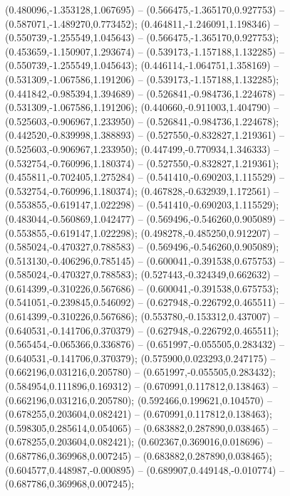  (0.480096,-1.353128,1.067695) -- (0.566475,-1.365170,0.927753) -- (0.587071,-1.489270,0.773452);
 (0.464811,-1.246091,1.198346) -- (0.550739,-1.255549,1.045643) -- (0.566475,-1.365170,0.927753);
 (0.453659,-1.150907,1.293674) -- (0.539173,-1.157188,1.132285) -- (0.550739,-1.255549,1.045643);
 (0.446114,-1.064751,1.358169) -- (0.531309,-1.067586,1.191206) -- (0.539173,-1.157188,1.132285);
 (0.441842,-0.985394,1.394689) -- (0.526841,-0.984736,1.224678) -- (0.531309,-1.067586,1.191206);
 (0.440660,-0.911003,1.404790) -- (0.525603,-0.906967,1.233950) -- (0.526841,-0.984736,1.224678);
 (0.442520,-0.839998,1.388893) -- (0.527550,-0.832827,1.219361) -- (0.525603,-0.906967,1.233950);
 (0.447499,-0.770934,1.346333) -- (0.532754,-0.760996,1.180374) -- (0.527550,-0.832827,1.219361);
 (0.455811,-0.702405,1.275284) -- (0.541410,-0.690203,1.115529) -- (0.532754,-0.760996,1.180374);
 (0.467828,-0.632939,1.172561) -- (0.553855,-0.619147,1.022298) -- (0.541410,-0.690203,1.115529);
 (0.483044,-0.560869,1.042477) -- (0.569496,-0.546260,0.905089) -- (0.553855,-0.619147,1.022298);
 (0.498278,-0.485250,0.912207) -- (0.585024,-0.470327,0.788583) -- (0.569496,-0.546260,0.905089);
 (0.513130,-0.406296,0.785145) -- (0.600041,-0.391538,0.675753) -- (0.585024,-0.470327,0.788583);
 (0.527443,-0.324349,0.662632) -- (0.614399,-0.310226,0.567686) -- (0.600041,-0.391538,0.675753);
 (0.541051,-0.239845,0.546092) -- (0.627948,-0.226792,0.465511) -- (0.614399,-0.310226,0.567686);
 (0.553780,-0.153312,0.437007) -- (0.640531,-0.141706,0.370379) -- (0.627948,-0.226792,0.465511);
 (0.565454,-0.065366,0.336876) -- (0.651997,-0.055505,0.283432) -- (0.640531,-0.141706,0.370379);
 (0.575900,0.023293,0.247175) -- (0.662196,0.031216,0.205780) -- (0.651997,-0.055505,0.283432);
 (0.584954,0.111896,0.169312) -- (0.670991,0.117812,0.138463) -- (0.662196,0.031216,0.205780);
 (0.592466,0.199621,0.104570) -- (0.678255,0.203604,0.082421) -- (0.670991,0.117812,0.138463);
 (0.598305,0.285614,0.054065) -- (0.683882,0.287890,0.038465) -- (0.678255,0.203604,0.082421);
 (0.602367,0.369016,0.018696) -- (0.687786,0.369968,0.007245) -- (0.683882,0.287890,0.038465);
 (0.604577,0.448987,-0.000895) -- (0.689907,0.449148,-0.010774) -- (0.687786,0.369968,0.007245);
